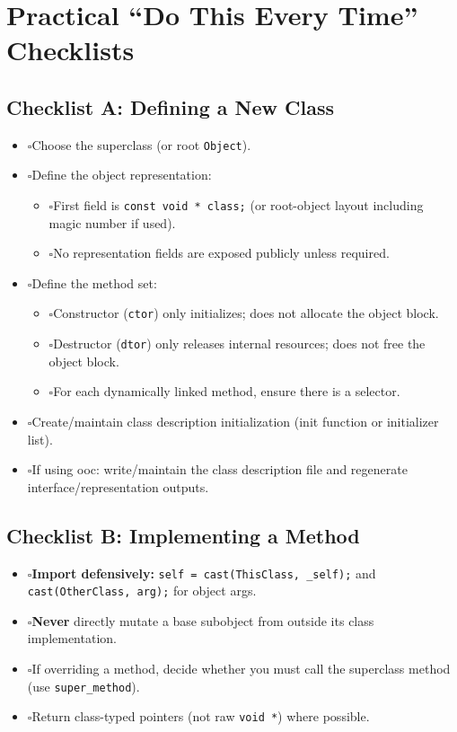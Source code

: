\documentclass[11pt]{article}
\newcommand{\cb}{\(\square\)}
\begin{document}
\section{Practical ``Do This Every Time'' Checklists}

\subsection{Checklist A: Defining a New Class}

\begin{itemize}
  \item \cb Choose the superclass (or root \texttt{Object}).
  \item \cb Define the object representation:
    \begin{itemize}
      \item \cb First field is \texttt{const void * class;} (or root-object layout including magic number if used).
      \item \cb No representation fields are exposed publicly unless required.
    \end{itemize}
  \item \cb Define the method set:
    \begin{itemize}
      \item \cb Constructor (\texttt{ctor}) only initializes; does not allocate the object block.
      \item \cb Destructor (\texttt{dtor}) only releases internal resources; does not free the object block.
      \item \cb For each dynamically linked method, ensure there is a selector.
    \end{itemize}
  \item \cb Create/maintain class description initialization (init function or initializer list).
  \item \cb If using ooc: write/maintain the class description file and regenerate interface/representation outputs.
\end{itemize}

\subsection{Checklist B: Implementing a Method}

\begin{itemize}
  \item \cb \textbf{Import defensively:} \texttt{self = cast(ThisClass, \_self);} and \texttt{cast(OtherClass, arg);} for object args.
  \item \cb \textbf{Never} directly mutate a base subobject from outside its class implementation.
  \item \cb If overriding a method, decide whether you must call the superclass method (use \texttt{super\_method}).
  \item \cb Return class-typed pointers (not raw \texttt{void *}) where possible.
\end{itemize}
\end{document}
